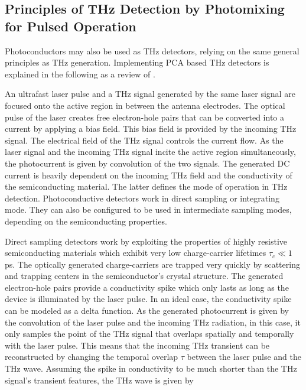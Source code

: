 \subsection{Principles of THz Detection by Photomixing for Pulsed Operation}

Photoconductors may also be used as THz detectors, relying on the same general principles as THz generation. Implementing PCA based THz detectors is explained in the following as a review of \cite{preuPrinciplesTHzGeneration2015,castro-camusPhotoconductiveResponseCorrection2008}. 

An ultrafast laser pulse and a THz signal generated by the same laser signal are focused onto the active region in between the antenna electrodes. The optical pulse of the laser creates free electron-hole pairs that can be converted into a current by applying a bias field. This bias field is provided by the incoming THz signal. The electrical field of the THz signal controls the current flow. As the laser signal and the incoming THz signal incite the active region simultaneously, the photocurrent is given by convolution of the two signals. The generated DC current is heavily dependent on the incoming THz field and the conductivity of the semiconducting material. The latter defines the mode of operation in THz detection. Photoconductive detectors work in direct sampling or integrating mode. They can also be configured to be used in intermediate sampling modes, depending on the semiconducting properties.

Direct sampling detectors work by exploiting the properties of highly resistive semiconducting materials which exhibit very low charge-carrier lifetimes $\tau_c \ll 1$ \si{\pico \s}. The optically generated charge-carriers are trapped very quickly by scattering and trapping centers in the semiconductor's crystal structure. The generated electron-hole pairs provide a conductivity spike which only lasts as long as the device is illuminated by the laser pulse. In an ideal case, the conductivity spike can be modeled as a delta function. As the generated photocurrent is given by the convolution of the laser pulse and the incoming THz radiation, in this case, it only samples the point of the THz signal that overlaps spatially and temporally with the laser pulse. This means that the incoming THz transient can be reconstructed by changing the temporal overlap $\tau$ between the laser pulse and the THz wave. Assuming the spike in conductivity to be much shorter than the THz signal's transient features, the THz wave is given by

